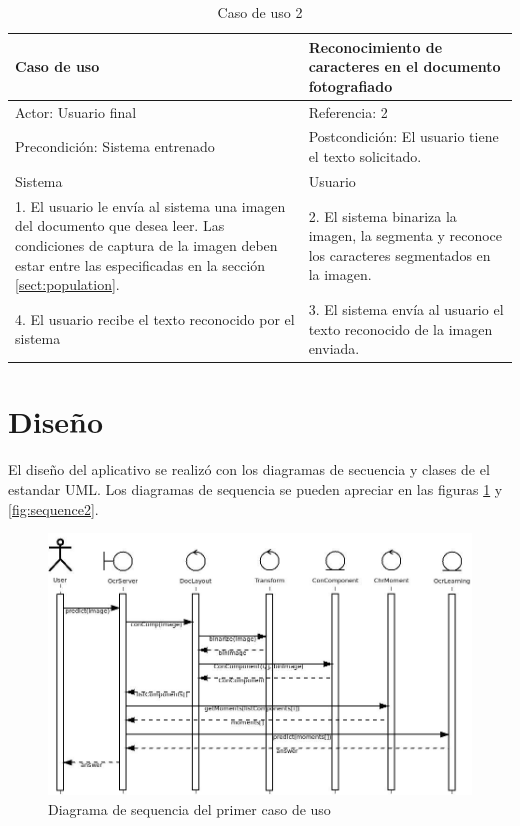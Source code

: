 \documentclass[a4paper, 11pt, oneside]{report}
\begin{document}
\begin{table}
\begin{center}
\begin{tabular}{|p{6cm}|p{6cm}|}
	\hline
	Caso de uso & Reconocimiento de caracteres en el documento fotografiado\\
	\hline
	Actor: Usuario final & Referencia: 2 \\
	\hline
	Precondición: Sistema entrenado & Postcondición: El usuario tiene el texto solicitado. \\
	\hline
	Sistema & Usuario \\
	\hline
	1. El usuario le envía al sistema una imagen del documento que desea leer. Las condiciones de captura de la imagen deben estar entre las especificadas en la sección \ref{sect:population}. &
	2. El sistema binariza la imagen, la segmenta y reconoce los caracteres segmentados en la imagen. \\
	\hline
	4. El usuario recibe el texto reconocido por el sistema &
	3. El sistema envía al usuario el texto reconocido de la imagen enviada. \\
	\hline
\end{tabular}
\end{center}
\caption{Caso de uso 2}	
\label{tb:uc2}
\end{table}

\section{Diseño}

El diseño del aplicativo se realizó con los diagramas de secuencia y clases de el estandar UML. Los diagramas de sequencia se pueden apreciar en las figuras \ref{fig:sequence1} y \ref{fig:sequence2}.

\begin{figure}
\begin{center}
\includegraphics[width=20cm]{diagrams/sequence1.jpeg}
\end{center}
\caption{Diagrama de sequencia del primer caso de uso}
\label{fig:sequence1}
\end{figure}
\end{document}
